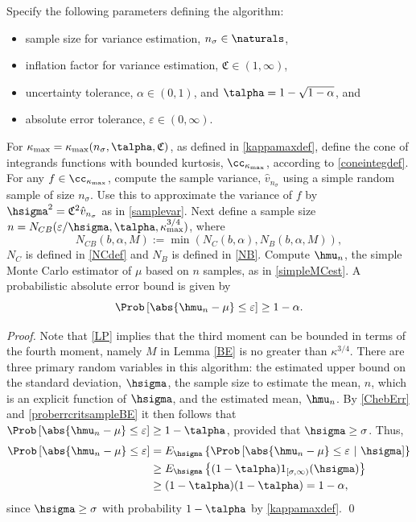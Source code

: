 \documentclass[graybox]{svmult}
\newcommand{\hv}{\hat{v}}
\newcommand{\fudge}{\mathfrak{C}}
\begin{document}
\begin{theorem} \label{mainadaptthm} Specify the following parameters defining the algorithm:
\begin{itemize}
\item sample size for variance estimation, $n_{\sigma} \in \naturals$,
\item inflation factor for variance estimation, $\fudge \in (1,\infty)$,
\item uncertainty tolerance, $\alpha\in (0,1)$, and $\talpha = 1 - \sqrt{1 - \alpha}$, and
\item absolute error tolerance, $\varepsilon \in (0,\infty)$. 
\end{itemize} 
For $\kappa_{\max}=\kappa_{\max}(n_{\sigma},\talpha,\fudge)$, as defined in \eqref{kappamaxdef}, define the cone of integrands functions with bounded kurtosis, $\cc_{\kappa_{\max}}$, according to \eqref{coneintegdef}.  For any $f \in \cc_{\kappa_{\max}}$, compute the sample variance, $\hv_{n_{\sigma}}$ using a simple random sample of size $n_{\sigma}$. Use this to approximate the variance of $f$ by $\hsigma^2 = \fudge^2 \hv_{n_{\sigma}}$ as in \eqref{samplevar}.  Next define a sample size $n = N_{CB}(\varepsilon/\hsigma,\talpha,\kappa_{\max}^{3/4})$, where
\begin{equation} \label{NCBdef}
N_{CB}(b,\alpha,M) := \min\left( N_C(b,\alpha), N_B(b,\alpha,M) \right),
\end{equation} 
$N_C$ is defined in \eqref{NCdef} and  $N_B$ is defined in \eqref{NB}.  Compute $\hmu_n$, the simple Monte Carlo estimator of $\mu$ based on $n$ samples, as in \eqref{simpleMCest}.  A probabilistic absolute error bound is given by
\[
\Prob\left[\abs{\hmu_n-\mu} \le \varepsilon \right] \geq 1-\alpha.
\]
\end{theorem}
\begin{proof} Note that \eqref{LP} implies that the third moment can be bounded in terms of the fourth moment, namely $M$ in Lemma \ref{BE} is no greater than $\kappa^{3/4}$. There are three primary random variables in this algorithm:  the estimated upper bound on the standard deviation, $\hsigma$, the sample size to estimate the mean, $n$, which is an explicit function of $\hsigma$, and the estimated mean, $\hmu_n$. By  \eqref{ChebErr} and \eqref{proberrcritsampleBE} it then follows that  $\Prob\left[\abs{\hmu_n-\mu} \le \varepsilon \right] \geq 1-\talpha$, provided that $\hsigma  \ge \sigma$. Thus, 
\begin{align*}
\Prob\left[\abs{\hmu_n-\mu} \le \varepsilon \right] &
= E_{\hsigma} \left\{\Prob\left[\abs{\hmu_n-\mu} \le \varepsilon \ | \ \hsigma \right] \right\} \\
& \ge E_{\hsigma} \left\{(1-\talpha) 1_{[\sigma,\infty)}(\hsigma) \right\}\\
& \ge (1-\talpha) (1-\talpha) = 1-\alpha,
\end{align*}
since $\hsigma \ge \sigma$ with probability $1-\talpha$ by \eqref{kappamaxdef}.  \qed
\end{proof}
\end{document}
